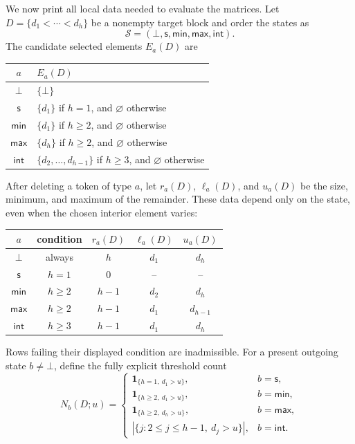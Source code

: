 \documentclass[a4paper,10pt]{amsart}
\theoremstyle{definition}
\theoremstyle{remark}
\newcommand{\ind}{\mathbf 1}
\newcommand{\botstate}{\bot}
\begin{document}
We now print all local data needed to evaluate the matrices.  Let
$D=\{d_1<\cdots<d_h\}$ be a nonempty target block and order the states as
\[
 \mathcal S=(\botstate,\mathsf{s},\mathsf{min},\mathsf{max},\mathsf{int}).
\]
The candidate selected elements $E_a(D)$ are
\begin{center}
\begin{tabular}{c@{\qquad}l}
\toprule
$a$&$E_a(D)$\\
\midrule
$\botstate$&$\{\botstate\}$\\
$\mathsf{s}$&$\{d_1\}$ if $h=1$, and $\varnothing$ otherwise\\
$\mathsf{min}$&$\{d_1\}$ if $h\ge2$, and $\varnothing$ otherwise\\
$\mathsf{max}$&$\{d_h\}$ if $h\ge2$, and $\varnothing$ otherwise\\
$\mathsf{int}$&$\{d_2,\ldots,d_{h-1}\}$ if $h\ge3$, and $\varnothing$ otherwise\\
\bottomrule
\end{tabular}
\end{center}
After deleting a token of type $a$, let $r_a(D)$, $\ell_a(D)$, and $u_a(D)$
be the size, minimum, and maximum of the remainder.  These data depend only
on the state, even when the chosen interior element varies:
\begin{center}
\begin{tabular}{c@{\qquad}c@{\qquad}c@{\qquad}c@{\qquad}c}
\toprule
$a$&condition&$r_a(D)$&$\ell_a(D)$&$u_a(D)$\\
\midrule
$\botstate$&always&$h$&$d_1$&$d_h$\\
$\mathsf{s}$&$h=1$&$0$&--&--\\
$\mathsf{min}$&$h\ge2$&$h-1$&$d_2$&$d_h$\\
$\mathsf{max}$&$h\ge2$&$h-1$&$d_1$&$d_{h-1}$\\
$\mathsf{int}$&$h\ge3$&$h-1$&$d_1$&$d_h$\\
\bottomrule
\end{tabular}
\end{center}
Rows failing their displayed condition are inadmissible.  For a present
outgoing state $b\ne\botstate$, define the fully explicit threshold count
\begin{equation}\label{eq:threshold-count}
 N_b(D;u)=
 \begin{cases}
 \ind_{\{h=1,\ d_1>u\}},&b=\mathsf{s},\\
 \ind_{\{h\ge2,\ d_1>u\}},&b=\mathsf{min},\\
 \ind_{\{h\ge2,\ d_h>u\}},&b=\mathsf{max},\\
 |\{j:2\le j\le h-1,\ d_j>u\}|,&b=\mathsf{int}.
 \end{cases}
\end{equation}
\end{document}
